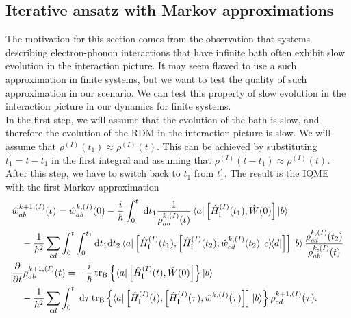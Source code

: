 \subsection{Iterative ansatz with Markov approximations}
\label{Iterative ansatz with Markov approximation}
The motivation for this section comes from the observation that systems describing electron-phonon interactions that have infinite bath often exhibit slow evolution in the interaction picture. It may seem flawed to use a such approximation in finite systems, but we want to test the quality of such approximation in our scenario. We can test this property of slow evolution in the interaction picture in our dynamics for finite systems. \\
\indent In the first step, we will assume that the evolution of the bath is slow, and therefore the evolution of the RDM in the interaction picture is slow. We will assume that $\rho^{(I)}(t_1)\approx\rho^{(I)}(t)$. This can be achieved by substituting $t^\prime_1 = t - t_1$ in the first integral and assuming that $\rho^{(I)}(t-t_1)\approx\rho^{(I)}(t)$. After this step, we have to switch back to $t_1$ from $t^\prime_1$. The result is the IQME with the first Markov approximation
\begin{equation}
\label{I_M1_ansatz}
    \begin{aligned}
    &\hat{w}^{k+1,(I)}_{ab}(t) = \hat{w}^{k, (I)}_{ab}(0) -\frac{i}{\hbar} \int_{0}^{t} \mathrm{~d} t_1  \frac{1}{\rho^{k, (I)}_{ab}(t)} \bra{a}\left[\hat{H}_{\mathrm{I}}^{(I)}(t_1), \hat{W}(0)\right]\ket{b} \\
     &\quad -\frac{1}{\hbar^{2}} \sum_{cd} \int_{0}^{t} \int_{0}^{t_1} \mathrm{d} t_1 \mathrm{d} t_2 \bra{a} \left[\hat{H}_{\mathrm{I}}^{(I)}(t_1),\left[\hat{H}_{\mathrm{I}}^{(I)}(t_2), \hat{w}^{k, (I)}_{cd}(t_2)  \ketbra{c}{d} \right]\right] \ket{b} \frac{\rho^{k, (I)}_{cd}(t_2) }{ \rho^{k, (I)}_{ab}(t)} \\
     &\frac{\partial}{\partial t} \rho_{ab}^{k+1, (I)}(t)=-\frac{i}{\hbar} \operatorname{tr}_{\mathrm{B}}   \left\{ \bra{a}\left[\hat{H}_{\mathrm{I}}^{(I)}(t), \hat{W}(0)\right]\right\}  \ket{b}\\
     &\quad -\frac{1}{\hbar^{2}} \sum_{cd}\int_{0}^{t} \mathrm{~d}\tau  \operatorname{tr}_{\mathrm{B}}   \left\{ \bra{a} \left[\hat{H}_{\mathrm{I}}^{(I)}(t),\left[\hat{H}_{\mathrm{I}}^{(I)}(\tau), \hat{w}^{k, (I)}(\tau) \right]\right] \ket{b} \right\}   \rho^{k+1,(I)}_{cd}(\tau). 
    \end{aligned}
\end{equation}
